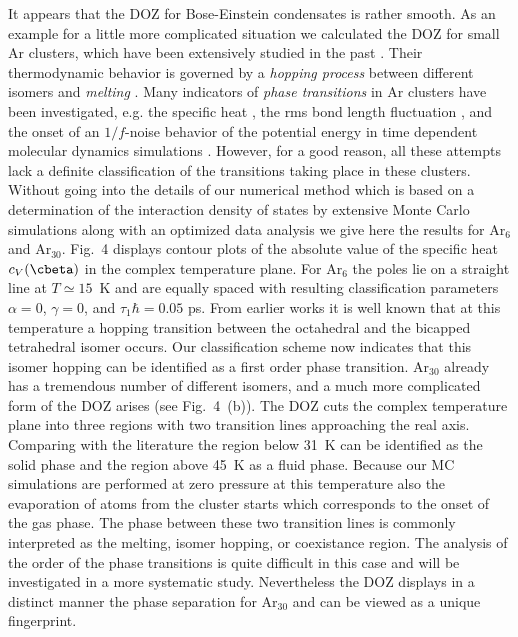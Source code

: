 It appears that the DOZ for Bose-Einstein condensates
is rather smooth. As an example for a little more complicated
situation we calculated the DOZ for small Ar clusters,
which have been extensively studied in the past
\cite{Berry:1984a,Berry:1984,Beck:1987,Jellinek:1986}. Their
thermodynamic behavior is governed by a {\sl hopping process} between
different isomers and {\sl melting} 
\cite{Labastie:1990,Wales:1989,Kunz:1994}. Many indicators of
{\sl phase transitions} in Ar clusters have been investigated, e.g.
the specific heat \cite{bgh96,hbsh96}, the rms bond length
fluctuation \cite{bor94a}, and the onset of an $1/f$-noise behavior of
the potential energy in time dependent molecular dynamics simulations
\cite{Nayak:1995}. However, for a good reason, all these 
attempts lack a definite classification of the transitions taking
place in these clusters.
Without going into the details of our numerical method which is based on
a determination of the interaction density of states by extensive Monte
Carlo simulations along with an optimized data analysis
\cite{Ferren:1989} we give here the results for Ar$_{6}$ and Ar$_{30}$.
Fig.~4 displays contour plots of the absolute value of the specific
heat $c_V(\cbeta)$ in the complex temperature plane. 
For Ar$_6$ the poles lie on a straight line at $T\simeq 15$~K and are
equally spaced with resulting classification parameters $\alpha=0$,
$\gamma=0$, and $\tau_1 \hbar = 0.05$ ps. From earlier works
\cite{fhb93} it is well known that at this temperature a hopping
transition between    the octahedral and the bicapped tetrahedral isomer
occurs. Our classification scheme now indicates that this isomer hopping
can be identified as a first order phase transition.  Ar$_{30}$ already
has a tremendous number of different isomers, and a much more
complicated form of the DOZ arises (see Fig.~4~(b)).  The DOZ cuts the
complex temperature plane into three regions with two transition lines
approaching the real axis. Comparing with the literature the region
below 31~K can be identified as the solid phase and the region above
45~K as a fluid phase. Because our MC simulations are performed at zero
pressure at this temperature also the evaporation of atoms from the
cluster starts which corresponds to the onset of the gas phase. The
phase between these two transition lines is commonly interpreted as the
melting, isomer hopping, or coexistance region.  The analysis of the
order of the phase transitions is quite difficult in this case and will
be investigated in a more systematic study.  Nevertheless the DOZ
displays in a distinct manner the phase separation for Ar$_{30}$ and can
be viewed as a unique fingerprint.

